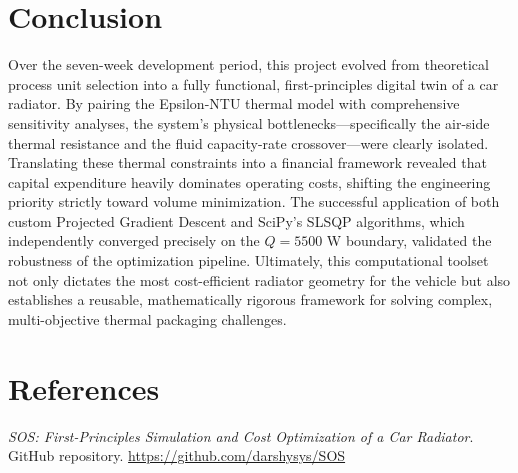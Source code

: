 \documentclass[12pt, a4paper]{article}
\begin{document}
\section{Conclusion}
Over the seven-week development period, this project evolved from theoretical process unit selection into a fully functional, first-principles digital twin of a car radiator. By pairing the Epsilon-NTU thermal model with comprehensive sensitivity analyses, the system's physical bottlenecks—specifically the air-side thermal resistance and the fluid capacity-rate crossover—were clearly isolated. Translating these thermal constraints into a financial framework revealed that capital expenditure heavily dominates operating costs, shifting the engineering priority strictly toward volume minimization. The successful application of both custom Projected Gradient Descent and SciPy's SLSQP algorithms, which independently converged precisely on the $Q = 5500$ W boundary, validated the robustness of the optimization pipeline. Ultimately, this computational toolset not only dictates the most cost-efficient radiator geometry for the vehicle but also establishes a reusable, mathematically rigorous framework for solving complex, multi-objective thermal packaging challenges.

\section*{References}
\begin{enumerate}
    \textit{SOS: First-Principles Simulation and Cost Optimization of a Car Radiator}. GitHub repository. \url{https://github.com/darshysys/SOS}
\end{enumerate}
\end{document}
